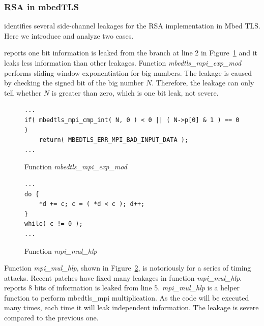 \subsubsection{RSA in mbedTLS}
\tool{} identifies several side-channel leakages for the RSA implementation in
Mbed TLS. Here we introduce and analyze two cases.

\tool{} reports one bit information is leaked from the branch at line 2 in
Figure~\ref{fig:mbedtls_rsa_1} and it leaks less information than other
leakages. Function \emph{mbedtls\_mpi\_exp\_mod} performs sliding-window
exponentiation for big numbers. The leakage is caused by checking the signed bit
of the big number $N$. Therefore, the leakage can only tell whether $N$ is
greater than zero, which is one bit leak, not severe.

\begin{figure}%
    \centering
    \begin{lstlisting}[xleftmargin=.02\textwidth,xrightmargin=.01\textwidth]
...
if( mbedtls_mpi_cmp_int( N, 0 ) < 0 || ( N->p[0] & 1 ) == 0 )
    return( MBEDTLS_ERR_MPI_BAD_INPUT_DATA );
...
\end{lstlisting}
    \vspace*{-6pt}
    \caption{Function \textit{mbedtls\_mpi\_exp\_mod}}
    \label{fig:mbedtls_rsa_1}
    \vspace*{-6pt}
\end{figure}

\begin{figure}%
    \centering
    \begin{lstlisting}[xleftmargin=.02\textwidth,xrightmargin=.01\textwidth]
...
do {
    *d += c; c = ( *d < c ); d++;
}
while( c != 0 );
...
\end{lstlisting}
    \vspace*{-6pt}
    \caption{Function \textit{mpi\_mul\_hlp}}
    \label{fig:mbedtls_rsa_2}
    \vspace*{-6pt}
\end{figure}

Function \emph{mpi\_mul\_hlp}, shown in Figure~\ref{fig:mbedtls_rsa_2},
is notoriously for a series of timing attacks.
Recent patches have fixed many leakages in function \emph{mpi\_mul\_hlp}.
\tool{} reports 8 bits of information is leaked from line 5.
\emph{mpi\_mul\_hlp} is a helper function to perform mbedtls\_mpi
multiplication. As the code will be executed many times, each time it will leak
independent information. The leakage is severe compared to the previous one.

